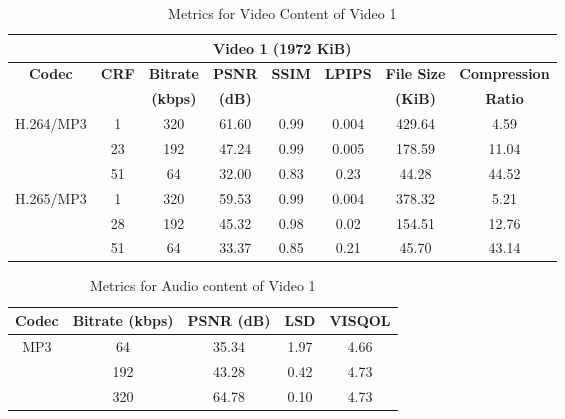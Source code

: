     \begin{table}[H]
        \centering
        \caption{Metrics for Video Content of Video 1}
        \label{table:vid-met-1}
        \begin{tabular}{|c|c|c|c|c|c|c|c|}
        \hline
        \multicolumn{8}{|c|}{\textbf{Video 1 (1972 KiB)}} \\ \hline
        \multirow{2}{*}{\textbf{Codec}} & \multirow{2}{*}{\textbf{CRF}} & \textbf{Bitrate} & \textbf{PSNR} & \textbf{SSIM} & \textbf{LPIPS} & \textbf{File Size} & \textbf{Compression} \\ 
        &  & \textbf{(kbps)} & \textbf{(dB)} &  &  & \textbf{(KiB)} & \textbf{Ratio} \\ \hline
        \multirow{3}{*}{H.264/MP3} & 1  & 320 & 61.60 & 0.99 & 0.004 & 429.64  & 4.59 \\ \cline{2-8} 
                                & 23 & 192 & 47.24 & 0.99 & 0.005 & 178.59  & 11.04 \\ \cline{2-8} 
                                & 51 & 64  & 32.00 & 0.83 & 0.23 & 44.28   & 44.52 \\ \hline
        \multirow{3}{*}{H.265/MP3} & 1  & 320 & 59.53 & 0.99 & 0.004 & 378.32  & 5.21 \\ \cline{2-8} 
                                & 28 & 192 & 45.32 & 0.98 & 0.02 & 154.51  & 12.76 \\ \cline{2-8} 
                                & 51 & 64  & 33.37 & 0.85 & 0.21 & 45.70   & 43.14 \\ \hline
        \end{tabular}
    \end{table}

    \begin{table}[H]
        \centering
        \caption{Metrics for Audio content of Video 1}
        \label{table:aud-met-1}
        \begin{tabular}{|c|c|c|c|c|}
        \hline
        \textbf{Codec} & \textbf{Bitrate (kbps)} & \textbf{PSNR (dB)} & \textbf{LSD} & \textbf{VISQOL} \\ \hline
        \multirow{3}{*}{MP3} & 64  & 35.34 & 1.97 & 4.66 \\ \cline{2-5} 
                                   & 192 & 43.28 & 0.42 & 4.73 \\ \cline{2-5} 
                                   & 320 & 64.78 & 0.10 & 4.73 \\ \hline
        \end{tabular}
    \end{table}
    
